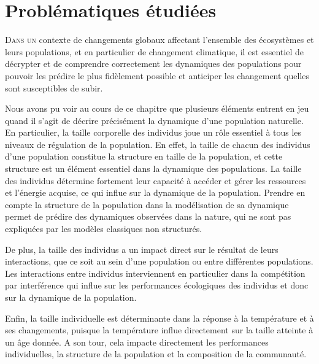 \chapter{Problématiques étudiées}

\lettrine[lines=3]{D}{ans un} contexte de changements globaux affectant
l'ensemble des écosystèmes et leurs populations, et en particulier de changement climatique, il est
essentiel de décrypter et de comprendre correctement les dynamiques des
populations pour pouvoir les prédire le plus fidèlement possible et anticiper
les changement quelles sont susceptibles de subir.

Nous avons pu voir au cours de ce chapitre que plusieurs éléments entrent
en jeu quand il s'agit de décrire précisément la dynamique d'une population
naturelle. En particulier, la taille corporelle des individus joue un rôle
essentiel à tous les niveaux de régulation de la population. En effet, la taille
de chacun des individus d'une population constitue la structure en taille de la
population, et cette structure est un élément essentiel dans la
dynamique des populations. La taille des individus détermine fortement
leur capacité à accéder et gérer les ressources et l'énergie acquise, ce qui
influe sur la dynamique de la population. Prendre en compte la structure de la
population dans la modélisation de sa dynamique permet de prédire des dynamiques
observées dans la nature, qui ne sont pas expliquées par les modèles classiques
non structurés.

De plus, la taille des individus a un impact direct sur le résultat de leurs
interactions, que ce soit au sein d'une population ou entre différentes
populations. Les interactions entre individus interviennent en particulier dans
la compétition par interférence qui influe sur les performances écologiques des
individus et donc sur la dynamique de la population. 

Enfin, la taille individuelle est déterminante dans la réponse à la température
et à ses changements, puisque la température influe directement sur la taille
atteinte à un âge donnée. A son tour, cela impacte directement les performances
individuelles, la structure de la population et la composition de la communauté. 

